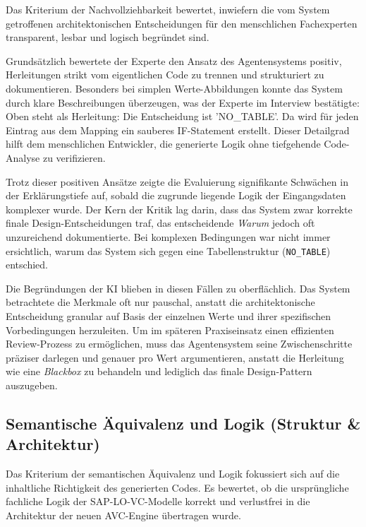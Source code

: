 Das Kriterium der Nachvollziehbarkeit bewertet, inwiefern die vom System getroffenen architektonischen Entscheidungen für den menschlichen Fachexperten transparent, lesbar und logisch begründet sind. 

Grundsätzlich bewertete der Experte den Ansatz des Agentensystems positiv, Herleitungen strikt vom eigentlichen Code zu trennen und strukturiert zu dokumentieren. Besonders bei simplen Werte-Abbildungen konnte das System durch klare Beschreibungen überzeugen, was der Experte im Interview bestätigte: \glqq Oben steht als Herleitung: Die Entscheidung ist 'NO\_TABLE'. Da wird für jeden Eintrag aus dem Mapping ein sauberes IF-Statement erstellt.\grqq{} Dieser Detailgrad hilft dem menschlichen Entwickler, die generierte Logik ohne tiefgehende Code-Analyse zu verifizieren.

Trotz dieser positiven Ansätze zeigte die Evaluierung signifikante Schwächen in der Erklärungstiefe auf, sobald die zugrunde liegende Logik der Eingangsdaten komplexer wurde. Der Kern der Kritik lag darin, dass das System zwar korrekte finale Design-Entscheidungen traf, das entscheidende \textit{Warum} jedoch oft unzureichend dokumentierte. Bei komplexen Bedingungen war nicht immer ersichtlich, warum das System sich gegen eine Tabellenstruktur (\texttt{NO\_TABLE}) entschied.

Die Begründungen der \ac{KI} blieben in diesen Fällen zu oberflächlich. Das System betrachtete die Merkmale oft nur pauschal, anstatt die architektonische Entscheidung granular auf Basis der einzelnen Werte und ihrer spezifischen Vorbedingungen herzuleiten. Um im späteren Praxiseinsatz einen effizienten Review-Prozess zu ermöglichen, muss das Agentensystem seine Zwischenschritte präziser darlegen und genauer pro Wert argumentieren, anstatt die Herleitung wie eine \textit{Blackbox} zu behandeln und lediglich das finale Design-Pattern auszugeben.

\subsection{Semantische Äquivalenz und Logik (Struktur \& Architektur)}
\label{subsubsec:eval_semantik_logik}

Das Kriterium der semantischen Äquivalenz und Logik fokussiert sich auf die inhaltliche Richtigkeit des generierten Codes. Es bewertet, ob die ursprüngliche fachliche Logik der SAP-\ac{LO-VC}-Modelle korrekt und verlustfrei in die Architektur der neuen \ac{AVC}-Engine übertragen wurde.

